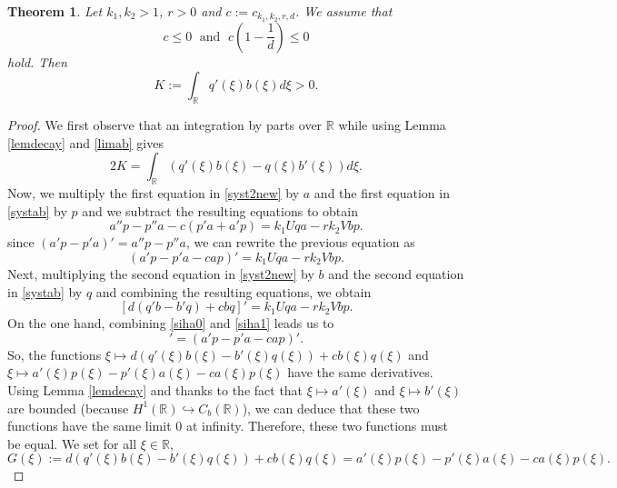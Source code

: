 \documentclass[11pt]{article}
\numberwithin{equation}{section}
\newcommand{\1}{\mathbbm{1}}
\numberwithin{equation}{section}
\newtheorem{theorem}{Theorem}[section]
\theoremstyle{definition}
\def \R {\mathbb{R}}
\def \c{c_{k_1,k_2,r,d}}
\numberwithin{equation}{section}
\begin{document}
\begin{theorem}\label{theoimportant}
	Let $k_1,k_2>1$, $r>0$ and  $c:=\c$. We assume that 
	\begin{equation}\label{condition}
	c\leq 0	 \; \text{ and }\; c\left(1-\frac{1}{d}\right)\leq 0
	\end{equation}
hold. Then
	\begin{equation}\label{eq04}
		K:=\int_{\R}q'(\xi)b(\xi)d\xi>0.
	\end{equation}
\end{theorem}
\begin{proof}
We first observe that an integration by parts over $\R$ while using Lemma \ref{lemdecay} and \eqref{limab} gives
\begin{equation}\label{important0}
	2K= \int_{\R}\left(q'(\xi)b(\xi)-q(\xi)b'(\xi) \right)d\xi. 
\end{equation}
Now, we multiply the first equation in \eqref{syst2new} by $a$ and the first equation in \eqref{systab} by $p$ and we subtract the resulting equations to obtain
\begin{equation*}
a''p-p''a-c(p'a+a'p)=k_1Uqa-rk_2Vbp.
\end{equation*}
since $(a'p-p'a)'=a''p-p''a$, we can rewrite the previous equation as 
\begin{equation}\label{siha0}
	(a'p-p'a-cap)'=k_1Uqa-rk_2Vbp.
\end{equation}
Next, multiplying the second equation in \eqref{syst2new} by $b$ and the second equation in \eqref{systab} by $q$ and combining the resulting equations, we obtain
\begin{equation}\label{siha1}
	[d(q'b-b'q)+cbq]'=k_1Uqa-rk_2Vbp.
\end{equation}
On the one hand, combining \eqref{siha0} and \eqref{siha1} leads us to 
\begin{equation*}
	[d(q'b-b'q)+cbq]'=(a'p-p'a-cap)'.
\end{equation*}
So, the functions $\xi \mapsto d(q'(\xi)b(\xi)-b'(\xi)q(\xi))+cb(\xi)q(\xi)$ and $\xi \mapsto a'(\xi)p(\xi)-p'(\xi)a(\xi)-ca(\xi)p(\xi)$ have the same derivatives. Using Lemma \ref{lemdecay} and thanks to the fact that $\xi \mapsto a'(\xi)$ and $\xi\mapsto b'(\xi)$ are bounded (because $H^1(\R)\hookrightarrow  C_b(\R)$), we can deduce that these two functions have the same limit $0$ at infinity. Therefore, these two functions must be equal. We set for all $\xi \in \R$,
\begin{equation}\label{defG}
G(\xi):=d(q'(\xi)b(\xi)-b'(\xi)q(\xi))+cb(\xi)q(\xi)=a'(\xi)p(\xi)-p'(\xi)a(\xi)-ca(\xi)p(\xi).

\end{equation}
\end{proof}
\end{document}
